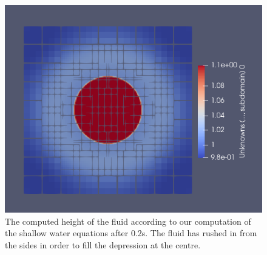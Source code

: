 \documentclass[12pt,letterpaper]{article}
\begin{document}
\begin{figure}[!h]
\centering
\includegraphics[height=0.50\linewidth]{pictures/SWE_end.png}
\caption{The computed height of the fluid according to our computation of the shallow water equations after 0.2s. The fluid has rushed in from the sides in order to fill the depression at the centre.}
\end{figure}
\end{document}
